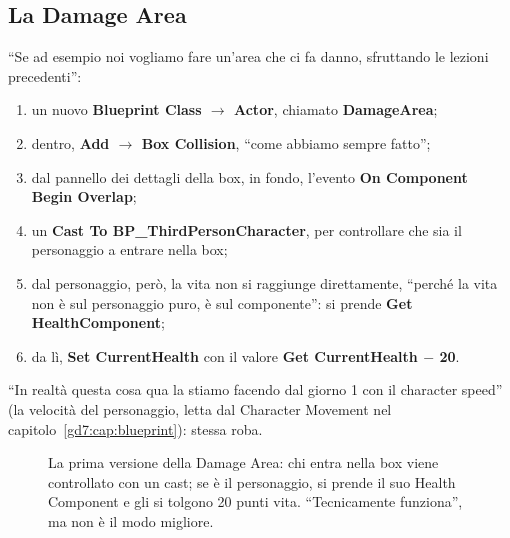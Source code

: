 \subsection{La Damage Area}

``Se ad esempio noi vogliamo fare un'area che ci fa danno, sfruttando le lezioni
precedenti'':
\begin{enumerate}
  \item un nuovo \textbf{Blueprint Class $\rightarrow$ Actor}, chiamato
        \textbf{DamageArea};
  \item dentro, \textbf{Add $\rightarrow$ Box Collision}, ``come abbiamo sempre
        fatto'';
  \item dal pannello dei dettagli della box, in fondo, l'evento
        \textbf{On Component Begin Overlap};
  \item un \textbf{Cast To BP\_ThirdPersonCharacter}, per controllare che sia
        il personaggio a entrare nella box;
  \item dal personaggio, però, la vita non si raggiunge direttamente, ``perché
        la vita non è sul personaggio puro, è sul componente'': si prende
        \textbf{Get HealthComponent};
  \item da lì, \textbf{Set CurrentHealth} con il valore \textbf{Get
        CurrentHealth $-$ 20}.
\end{enumerate}
``In realtà questa cosa qua la stiamo facendo dal giorno 1 con il character
speed'' (la velocità del personaggio, letta dal Character Movement nel
capitolo~\ref{gd7:cap:blueprint}): stessa roba.

\begin{figure}[htbp]
\centering
{}
\caption{La prima versione della Damage Area: chi entra nella box viene
controllato con un cast; se è il personaggio, si prende il suo Health Component
e gli si tolgono 20 punti vita. ``Tecnicamente funziona'', ma non è il modo
migliore.}
\label{gd13:fig:damage-v1}
\end{figure}

